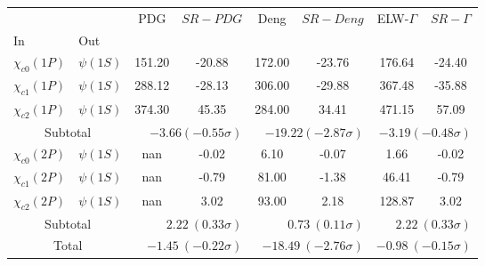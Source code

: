 \begin{tabular}{|l|l|c|c|c|c|c|c|}%
\hline%
&&PDG&$SR-PDG$&Deng&$SR-Deng$&ELW-$\Gamma$&$SR-\Gamma$\\%
In&Out&&&&&&\\%
\hline%
$\chi_{c0}(1P)$&$\psi(1S)$&151.20&-20.88&172.00&-23.76&176.64&-24.40\\%
$\chi_{c1}(1P)$&$\psi(1S)$&288.12&-28.13&306.00&-29.88&367.48&-35.88\\%
$\chi_{c2}(1P)$&$\psi(1S)$&374.30&45.35&284.00&34.41&471.15&57.09\\%
\hline%
\hline%
\multicolumn{2}{|c|}{Subtotal}&\multicolumn{2}{|r|}{$-3.66 (-0.55\sigma)$}&\multicolumn{2}{|r|}{$-19.22 (-2.87\sigma)$}&\multicolumn{2}{|r|}{$-3.19 (-0.48\sigma)$}\\%
\hline%
\hline%
$\chi_{c0}(2P)$&$\psi(1S)$&nan&-0.02&6.10&-0.07&1.66&-0.02\\%
$\chi_{c1}(2P)$&$\psi(1S)$&nan&-0.79&81.00&-1.38&46.41&-0.79\\%
$\chi_{c2}(2P)$&$\psi(1S)$&nan&3.02&93.00&2.18&128.87&3.02\\%
\hline%
\hline%
\multicolumn{2}{|c|}{Subtotal}&\multicolumn{2}{|r|}{$2.22~(0.33\sigma)$}&\multicolumn{2}{|r|}{$0.73~(0.11\sigma)$}&\multicolumn{2}{|r|}{$2.22~(0.33\sigma)$}\\%
\hline%
\hline%
\multicolumn{2}{|c|}{Total}&\multicolumn{2}{|r|}{$-1.45~(-0.22\sigma)$}&\multicolumn{2}{|r|}{$-18.49~(-2.76\sigma)$}&\multicolumn{2}{|r|}{$-0.98~(-0.15\sigma)$}\\%
\hline%
\end{tabular}